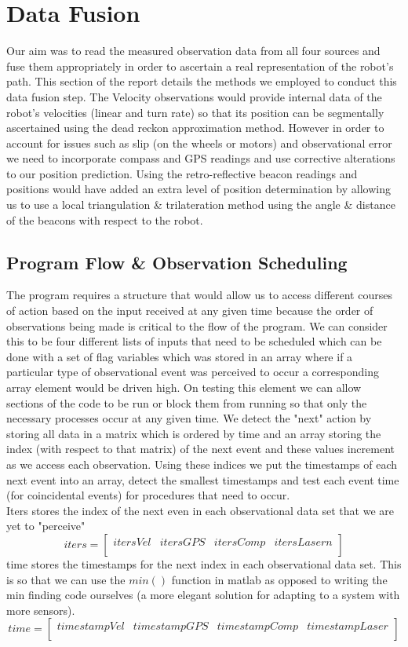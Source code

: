 \newpage
\section{Data Fusion}
	Our aim was to read the measured observation data from all four sources and fuse them appropriately in order to ascertain a real representation of the robot's path. This section of the report details the methods we employed to conduct this data fusion step. The Velocity observations would provide internal data of the robot's velocities (linear and turn rate) so that its position can be segmentally ascertained using the dead reckon approximation method. However in order to account for issues such as slip (on the wheels or motors) and observational error we need to incorporate compass and GPS readings and use corrective alterations to our position prediction. Using the retro-reflective beacon readings and positions would have added an extra level of position determination by allowing us to use a local triangulation \& trilateration method using the angle \& distance of the beacons with respect to the robot.
	\subsection{Program Flow \& Observation Scheduling}
		The program requires a structure that would allow us to access different courses of action based on the input received at any given time because the order of observations being made is critical to the flow of the program. We can consider this to be four different lists of inputs that need to be scheduled which can be done with a set of flag variables which was stored in an array where if a particular type of observational event was perceived to occur a corresponding array element would be driven high. On testing this element we can allow sections of the code to be run or block them from running so that only the necessary processes occur at any given time. 
		We detect the "next" action by storing all data in a matrix which is ordered by time and an array storing the index (with respect to that matrix) of the next event and these values increment as we access each observation. Using these indices we put the timestamps of each next event into an array, detect the smallest timestamps and test each event time (for coincidental events) for procedures that need to occur.\\
		
		Iters stores the index of the next even in each observational data set that we are yet to "perceive"
		$$ iters =
		\begin{bmatrix}
		itersVel & itersGPS & itersComp & itersLaser n\\
		\end{bmatrix}
		$$
		time stores the timestamps for the next index in each observational data set. This is so that we can use the $min()$ function in matlab as opposed to writing the min finding code ourselves (a more elegant solution for adapting to a system with more sensors).
		$$time =
		\begin{bmatrix}
		timestampVel & timestampGPS & timestampComp & timestampLaser\\
		\end{bmatrix}
		$$
		
